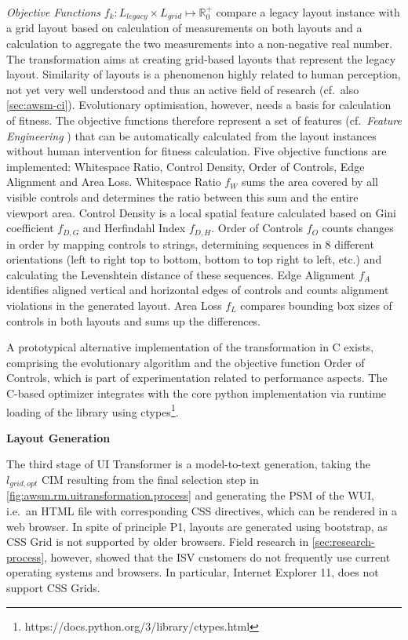 \emph{Objective Functions} \(f_k : L_{legacy} \times L_{grid} \mapsto \mathbb{R}_0^+\) compare a legacy layout instance with a grid layout based on calculation of measurements on both layouts and a calculation to aggregate the two measurements into a non-negative real number.
The transformation aims at creating grid-based layouts that represent the legacy layout.
Similarity of layouts is a phenomenon highly related to human perception, not yet very well understood and thus an active field of research (cf.~also \cref{sec:awsm-ci}).
Evolutionary optimisation, however, needs a basis for calculation of fitness.
The objective functions therefore represent a set of features (cf.~\emph{Feature Engineering} \autocite{Domingos2012}) that can be automatically calculated from the layout instances without human intervention for fitness calculation.
Five objective functions are implemented: Whitespace Ratio, Control Density, Order of Controls, Edge Alignment and Area Loss.
Whitespace Ratio \(f_W\) sums the area covered by all visible controls and determines the ratio between this sum and the entire viewport area.
Control Density is a local spatial feature calculated based on Gini coefficient \(f_{D,G}\) and Herfindahl Index \(f_{D,H}\).
Order of Controls \(f_O\) counts changes in order by mapping controls to strings, determining sequences in 8 different orientations (left to right top to bottom, bottom to top right to left, etc.) and calculating the Levenshtein distance of these sequences.
Edge Alignment \(f_A\) identifies aligned vertical and horizontal edges of controls and counts alignment violations in the generated layout.
Area Loss \(f_L\) compares bounding box sizes of controls in both layouts and sums up the differences.

A prototypical alternative implementation of the transformation in C exists, comprising the evolutionary algorithm and the objective function Order of Controls, which is part of experimentation related to performance aspects.
The C-based optimizer integrates with the core python implementation via runtime loading of the library using ctypes\footnote{https://docs.python.org/3/library/ctypes.html}.

\textbf{Layout Generation}

The third stage of UI Transformer is a model-to-text generation, taking the \(l_{grid, opt}\) CIM resulting from the final selection step in \cref{fig:awsm.rm.uitransformation.process} and generating the PSM of the WUI, i.e.~an HTML file with corresponding CSS directives, which can be rendered in a web browser.
In spite of principle P1, layouts are generated using bootstrap, as CSS Grid is not supported by older browsers.
Field research in \cref{sec:research-process}, however, showed that the ISV customers do not frequently use current operating systems and browsers.
In particular, Internet Explorer 11, does not support CSS Grids.

